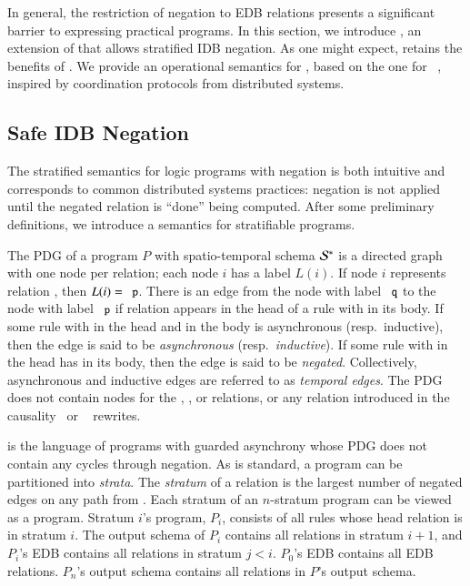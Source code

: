 In general, the restriction of negation to EDB relations presents a significant
barrier to expressing practical programs. In this section, we introduce \plang,
an extension of \slang that allows stratified IDB negation.  As one might expect, \plang retains the benefits of \slang.
We provide an operational semantics for \plang, based on the one for \lang~\cite{ameloot-operational}, inspired by coordination protocols from distributed systems.

\subsection{Safe IDB Negation}
\label{sec:perfect-construction}

The stratified semantics for logic programs with negation is both intuitive and corresponds to common
distributed systems practices: negation is not applied until the negated
relation is ``done'' being computed.  After some preliminary definitions, we introduce a semantics for stratifiable \lang programs.

The PDG of a \lang program $P$ with spatio-temporal schema $\stschema$ is a directed graph with one node per relation; each node $i$ has a label $L(i)$.  If node $i$ represents relation , then $L(i) = \dedalus{p}$.  There is an edge from the node with label $\dedalus{q}$ to the node with label $\dedalus{p}$ if relation  appears in the head of a rule with  in its body.  If some rule with  in the head and  in the body is asynchronous (resp.\ inductive), then the edge is said to be {\em asynchronous} (resp.\ {\em inductive}).  If some rule with  in the head has  in its body, then the edge is said to be {\em negated}.  Collectively, asynchronous and inductive edges are referred to as {\em temporal edges}.  The PDG does not contain nodes for the , , or  relations, or any relation introduced in the causality~\cite{ameloot-operational} or ~\cite{sacca-zaniolo} rewrites.

\plang is the language of \lang programs with guarded asynchrony whose PDG does not contain any cycles through negation.  As is standard, a \plang program can be partitioned into {\em strata}.  The {\em stratum} of a relation  is the largest number of negated edges on any path from .  Each stratum of an $n$-stratum \plang program can be viewed as a \slang program.  Stratum $i$'s program, $P_i$, consists of all rules whose head relation is in stratum $i$.  The output schema of $P_i$ contains all relations in stratum $i+1$, and $P_i$'s EDB contains all relations in stratum $j < i$.  $P_0$'s EDB contains all EDB relations.  $P_n$'s output schema contains all relations in $P$'s output schema.


